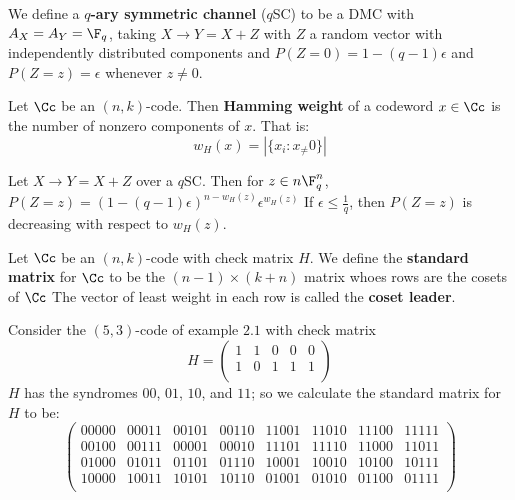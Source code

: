 \begin{definition}
    We define a \textbf{$q$-ary symmetric channel} ($q$SC) to be a DMC with
    $A_X=A_Y=\F_q$, taking  $X \rightarrow Y=X+Z$ with $Z$ a random vector with
    independently distributed components and  $P(Z=0)=1-(q-1)\epsilon$ and
    $P(Z=z)=\epsilon$ whenever $z \neq 0$.
\end{definition}

\begin{definition}
    Let $\Cc$ be an  $(n,k)$-code. Then \textbf{Hamming weight} of a codeword $x
    \in \Cc$ is the number of nonzero components of  $x$. That is:
    \begin{equation}
        w_H(x)=|\{x_i : x_ \neq 0\}|
    \end{equation}
\end{definition}

\begin{example}
    Let $X \rightarrow Y=X+Z$ over a $q$SC. Then for  $z \in n\F_q^n$,
    $P(Z=z)=(1-(q-1)\epsilon)^{n-w_H(z)}\epsilon^{w_H(z)}$ If $\epsilon \leq
    \frac{1}{q}$, then $P(Z=z)$ is decreasing with respect to $w_H(z)$.
\end{example}

\begin{definition}
    Let $\Cc$ be an $(n,k)$-code with check matrix $H$. We define the
    \textbf{standard matrix} for $\Cc$ to be the  $(n-1) \times (k+n)$ matrix
    whoes rows are the cosets of $\Cc$ The vector of least weight in each row is
    called the  \textbf{coset leader}.
\end{definition}

\begin{example}
    Consider the $(5,3)$-code of example $2.1$ with check matrix
    \begin{equation*}
        H=\begin{pmatrix}
                1 & 1 & 0 & 0 & 0 \\
                1 & 0 & 1 & 1 & 1 \\
          \end{pmatrix}
    \end{equation*}
    $H$ has the syndromes  $00$,  $01$,  $10$, and  $11$; so we calculate the
    standard matrix for  $H$ to be:
    \begin{equation*}
        \begin{pmatrix}
            00000 & 00011 & 00101 & 00110 & 11001 & 11010 & 11100 & 11111 \\
            00100 & 00111 & 00001 & 00010 & 11101 & 11110 & 11000 & 11011 \\
            01000 & 01011 & 01101 & 01110 & 10001 & 10010 & 10100 & 10111 \\
            10000 & 10011 & 10101 & 10110 & 01001 & 01010 & 01100 & 01111 \\
        \end{pmatrix}
    \end{equation*}
\end{example}

